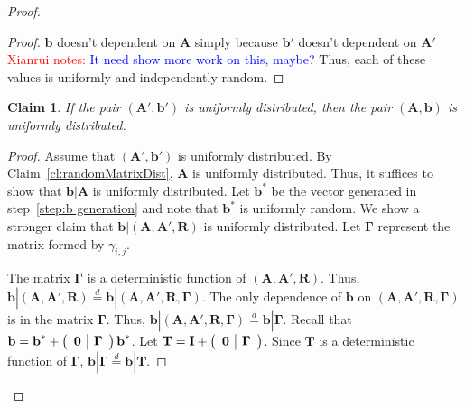 \documentclass[11pt]{article}
\newcommand{\clref}[1]{\mbox{Claim~\ref{#1}}}
\newcommand{\class}[1]{{\ensuremath{\mathsf{#1}}}}
\newcommand{\vect}[1]{\ensuremath{\textbf{#1}}}
\newcommand{\Fq}{\ensuremath{\mathbb{F}_q}}
\newcommand{\D}{\mathcal{D}}
\newcommand{\LWE}{\class{LWE}}
\newtheorem{claim}[theorem]{Claim}
\newcommand{\authnote}[2]{{\textcolor{red}{\textsf{#1 notes: }\textcolor{blue}{ #2}}\marginpar{\textcolor{red}{\textbf{!!!!!}}}}}
\newcommand{\authnote}[2]{}
\newcommand{\xnote}[1]{{\authnote{Xianrui}{#1}}}
\newcommand{\ve}{\vect{e}}
\newcommand{\vA}{\vect{A}}
\newcommand{\vR}{\vect{R}}
\newcommand{\vT}{\vect{T}}
\newcommand{\vx}{\vect{x}}
\newcommand{\va}{\vect{a}}
\newcommand{\vb}{\vect{b}}
\newcommand{\vgamma}{\mathbf{\Gamma}}
\newcommand{\vu}{\vect{u}}
\begin{document}
{\begin{proof}
\begin{proof}
$\vb$ doesn't dependent on $\vA$ simply because $\vb'$ doesn't dependent on $\vA'$ \xnote{It need show more work on this, maybe?}
Thus, each of these values is uniformly and independently random.
\end{proof}

%

\begin{claim}
If the pair $(\vA', \vb')$ is uniformly distributed, then the pair $(\vA, \vb)$ is uniformly distributed.
\end{claim}
\begin{proof}
Assume that $(\vA', \vb')$ is uniformly distributed.  By \clref{cl:randomMatrixDist}, $\vA$ is uniformly distributed.  Thus, it suffices to show that $\vb | \vA$ is uniformly distributed.  Let $\vb^*$ be the vector generated in step~\ref{step:b generation} and note that $\vb^*$ is uniformly random.  
We show  a stronger claim that $\vb |( \vA, \vA', \vR)$ is uniformly distributed.  Let $\vgamma$ represent the matrix formed by $\gamma_{i,j}$.  
 
 The matrix $\vgamma$ is a deterministic function of $(\vA, \vA', \vR)$.  Thus, $\vb | (\vA, \vA', \vR) \overset{d}= \vb | (\vA, \vA', \vR, \vgamma)$.  The only dependence of $\vb$ on $(\vA, \vA', \vR, \vgamma)$ is in the matrix $\vgamma$.  Thus, $ \vb | (\vA, \vA', \vR, \vgamma) \overset{d}= \vb | \vgamma$. Recall that $\vb = \vb^* +  \left(\begin{array}{c | c}\mathbf{0} &\vgamma\end{array}\right)\vb^*$.  Let $\vT = \vect{I}+  \left(\begin{array}{c | c}\mathbf{0} & \vgamma \end{array}\right)$.  Since $\vT$ is a deterministic function of $\vgamma$, $\vb | \vgamma \overset{d} = \vb | \vT$.
 

\end{proof}
\end{proof}}
\end{document}
